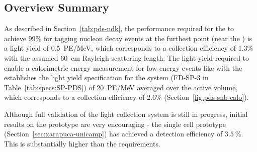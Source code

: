 



\subsection{Overview Summary} 
\label{sec:fdsp-pd-ov-summ}

As described in Section~\ref{tab:pds-ndk}, the performance required for the  to achieve 99\% for tagging nucleon decay events at the furthest point (near the ) is a light yield of \SI{0.5}{PE/MeV}, which corresponds to a collection efficiency of 1.3\% with the assumed \SI{60}{cm} Rayleigh scattering length. The light yield required to enable a calorimetric energy measurement for low-energy events like  with the  establishes the light yield specification for the system (FD-SP-3 in Table~\ref{tab:specs:SP-PDS}) of \SI{20}{PE/MeV} averaged over the active volume, which corresponds to a collection efficiency of 2.6\% (Section~\ref{fig:pds-snb-calo}).

Although full validation of the   light collection system is still in progress, initial results on the  prototype are very encouraging - the single cell prototype (Section~\ref{sec:xarapuca-unicamp}) has achieved a detection efficiency of $\SI{3.5}{\%}$.  This is substantially higher than the requirements.

